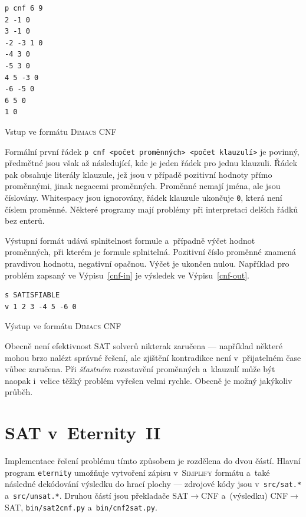 \documentclass[11pt, titlepage]{report}
\begin{document}
\begin{output}
\begin{verbatim}
p cnf 6 9
2 -1 0
3 -1 0
-2 -3 1 0
-4 3 0
-5 3 0
4 5 -3 0
-6 -5 0
6 5 0
1 0
\end{verbatim}
\caption{Vstup ve formátu \textsc{Dimacs CNF}}
\label{cnf-in}
\end{output}

Formální první řádek \texttt{p cnf <počet proměnných> <počet klauzulí>} je povinný, předmětné jsou však až následující, kde je jeden řádek pro jednu klauzuli. Řádek pak obsahuje literály klauzule, jež jsou v případě pozitivní hodnoty přímo proměnnými, jinak negacemi proměnných. Proměnné nemají jména, ale jsou číslovány. Whitespacy jsou ignorovány, řádek klauzule ukončuje \texttt{0}, která není číslem proměnné. Některé programy mají problémy při interpretaci delších řádků bez enterů.

Výstupní formát udává splnitelnost formule a~případně výčet hodnot proměnných, při kterém je formule splnitelná. Pozitivní číslo proměnné znamená pravdivou hodnotu, negativní opačnou. Výčet je ukončen nulou. Například pro problém zapsaný ve Výpisu~\ref{cnf-in} je výsledek ve Výpisu~\ref{cnf-out}.

\begin{output}
\begin{verbatim}
s SATISFIABLE
v 1 2 3 -4 5 -6 0
\end{verbatim}
\caption{Výstup ve formátu \textsc{Dimacs CNF}}
\label{cnf-out}
\end{output}

Obecně není efektivnost SAT solverů nikterak zaručena --- například některé mohou brzo nalézt správné řešení, ale zjištění kontradikce není v~přijatelném čase vůbec zaručena. Při \emph{šťastném} rozestavění proměnných a~klauzulí může být naopak i~velice těžký problém vyřešen velmi rychle. Obecně je možný jakýkoliv průběh.

\section{SAT v~Eternity~II}
\label{sec:sat-et}

Implementace řešení problému tímto způsobem je rozdělena do dvou částí. Hlavní program \texttt{eternity} umožňuje vytvoření zápisu v~\textsc{Simplify} formátu a~také následné dekódování výsledku do hrací plochy --- zdrojové kódy jsou v~\texttt{src/sat.*} a~\texttt{src/unsat.*}. Druhou částí jsou překladače SAT$\rightarrow$CNF a~(výsledku) CNF$\rightarrow$SAT, \texttt{bin/sat2cnf.py} a~\texttt{bin/cnf2sat.py}.
\end{document}
